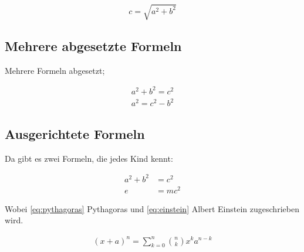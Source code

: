\documentclass[ 12pt, a4paper, parskip=full]{scrartcl}
\begin{document}
\begin{displaymath}
  c=\sqrt{a^2+b^2} 
\end{displaymath}

\subsection{Mehrere abgesetzte Formeln}
Mehrere Formeln abgesetzt;

\begin{align}
  a^2+b^2=c^2 \nonumber \\    %
  a^2=c^2-b^2 \nonumber       %
\end{align}

\subsection{Ausgerichtete Formeln}
Da gibt es zwei Formeln, die jedes Kind kennt: 

\begin{align}
  a^2 + b^2 &= c^2     \label{eq:pythagoras}  \\  
  e &= m c^2           \label{eq:einstein}  
\end{align}

Wobei \eqref{eq:pythagoras} Pythagoras und \eqref{eq:einstein} Albert Einstein zugeschrieben wird.


\begin{align}
\left(x+a\right)^n=\sum_{k=0}^{n}{\binom{n}{k}x^ka^{n-k}} \nonumber
\end{align}
\end{document}
